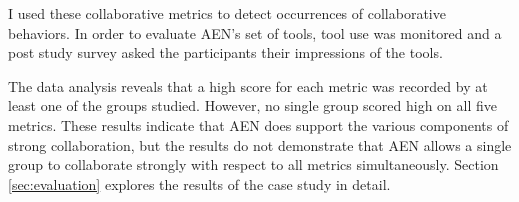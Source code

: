 

I used these collaborative metrics to detect occurrences of 
collaborative behaviors.  In order to evaluate AEN's set of tools, tool use
was monitored and a post study survey asked the participants their
impressions of the tools.

The data analysis reveals that a high score for each metric was recorded by
at least one of the groups studied.  However, no single group scored high
on all five metrics.  These results indicate that AEN does support the
various components of strong collaboration, but the results do not
demonstrate that AEN allows a single group to collaborate strongly with
respect to all metrics simultaneously.  Section \ref{sec:evaluation} explores
the results of the case study in detail.

